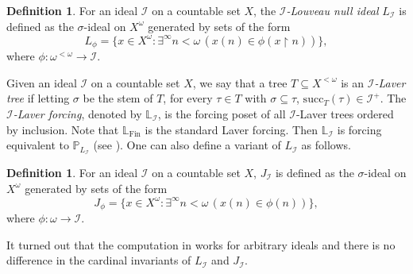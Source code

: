 \documentclass[a4paper,12pt]{amsart}
\theoremstyle{definition}
\newtheorem{dfn}[thm]{Definition}
\numberwithin{thm}{section}
\numberwithin{equation}{section}
\newcommand{\I}{\mathscr{I}}
\DeclareMathOperator{\Fin}{Fin}
\renewcommand{\subset}{\subseteq}
\begin{document}
    \begin{dfn}
        For an ideal $\I$ on a countable set $X$, the \emph{$\I$-Louveau null ideal} $L_{\mathscr{I}}$ is defined as the $\sigma$-ideal on $X^\omega$ generated by sets of the form
        \[
        L_\phi = \{x\in X^\omega:\exists^{\infty}n<\omega\,(x(n)\in\phi(x\upharpoonright n))\},
        \]
        where $\phi\colon\omega^{<\omega}\to\mathscr{I}$.
    \end{dfn}

    Given an ideal $\I$ on a countable set $X$, we say that a tree $T\subset X^{<\omega}$ is an \emph{$\I$-Laver tree} if letting $\sigma$ be the stem of $T$, for every $\tau\in T$ with $\sigma\subset\tau$, $\mathrm{succ}_T(\tau)\in\I^+$. The \emph{$\I$-Laver forcing}, denoted by $\mathbb{L}_\I$, is the forcing poset of all $\I$-Laver trees ordered by inclusion. Note that $\mathbb{L}_{\Fin}$ is the standard Laver forcing. Then $\mathbb{L}_\I$ is forcing equivalent to $\mathbb{P}_{L_\I}$ (see \cite{Mil12}).
    One can also define a variant of $L_\I$ as follows.
    
    \begin{dfn}
        For an ideal $\I$ on a countable set $X$, $J_{\mathscr{I}}$ is defined as the $\sigma$-ideal on $X^\omega$ generated by sets of the form
        \[
        J_\phi = \{x\in X^\omega:\exists^{\infty}n<\omega\,(x(n)\in\phi(n))\},
        \]
        where $\phi\colon\omega\to\mathscr{I}$.
    \end{dfn}

    It turned out that the computation in \cite{BS99} works for arbitrary ideals and there is no difference in the cardinal invariants of $L_\I$ and $J_\I$.
\end{document}
